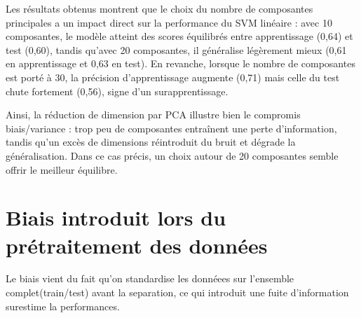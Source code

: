 \documentclass{rapport}
\begin{document}
Les résultats obtenus montrent que le choix du nombre de composantes principales a un impact direct sur la performance du SVM linéaire : avec 10 composantes, le modèle atteint des scores équilibrés entre apprentissage (0,64) et test (0,60), tandis qu’avec 20 composantes, il généralise légèrement mieux (0,61 en apprentissage et 0,63 en test). En revanche, lorsque le nombre de composantes est porté à 30, la précision d’apprentissage augmente (0,71) mais celle du test chute fortement (0,56), signe d’un surapprentissage.

Ainsi, la réduction de dimension par PCA illustre bien le compromis biais/variance : trop peu de composantes entraînent une perte d’information, tandis qu’un excès de dimensions réintroduit du bruit et dégrade la généralisation. Dans ce cas précis, un choix autour de 20 composantes semble offrir le meilleur équilibre.

\section{Biais introduit lors du prétraitement des données}

Le biais vient du fait qu'on standardise les donnéees sur l'ensemble complet(train/test) avant la separation, ce qui introduit une fuite d'information surestime la performances.

\newpage
\end{document}
